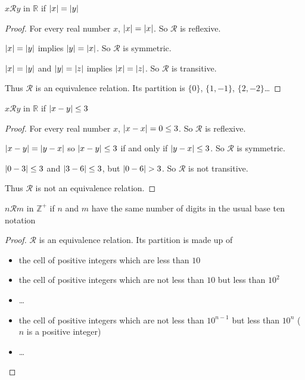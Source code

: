 \begin{exercise}
    $x\mathscr{R}y$ in $\mathbb{R}$ if $\left\vert{x}\right\vert = \left\vert{y}\right\vert$
\end{exercise}

\begin{proof}
    For every real number $x$, $\left\vert{x}\right\vert = \left\vert{x}\right\vert$. So $\mathscr{R}$ is reflexive.

    $\left\vert{x}\right\vert = \left\vert{y}\right\vert$ implies $\left\vert{y}\right\vert = \left\vert{x}\right\vert$. So $\mathscr{R}$ is symmetric.

    $\left\vert{x}\right\vert = \left\vert{y}\right\vert$ and $\left\vert{y}\right\vert = \left\vert{z}\right\vert$ implies $\left\vert{x}\right\vert = \left\vert{z}\right\vert$. So $\mathscr{R}$ is transitive.

    Thus $\mathscr{R}$ is an equivalence relation. Its partition is $\{ 0 \}$, $\{ 1, -1 \}$, $\{ 2, -2 \}$\ldots
\end{proof}

\begin{exercise}
    $x\mathscr{R}y$ in $\mathbb{R}$ if $\left\vert{x - y}\right\vert\le 3$
\end{exercise}

\begin{proof}
    For every real number $x$, $\left\vert{x - x}\right\vert = 0 \le 3$. So $\mathscr{R}$ is reflexive.

    $\left\vert{x - y}\right\vert = \left\vert{y - x}\right\vert$ so $\left\vert{x - y}\right\vert\le 3$ if and only if $\left\vert{y - x}\right\vert\le 3$. So $\mathscr{R}$ is symmetric.

    $\left\vert{0 - 3}\right\vert\le 3$ and $\left\vert{3 - 6}\right\vert\le 3$, but $\left\vert{0 - 6}\right\vert > 3$. So $\mathscr{R}$ is not transitive.

    Thus $\mathscr{R}$ is not an equivalence relation.
\end{proof}

\begin{exercise}
    $n\mathscr{R}m$ in $\mathbb{Z}^{+}$ if $n$ and $m$ have the same number of digits in the usual base ten notation
\end{exercise}

\begin{proof}
    $\mathscr{R}$ is an equivalence relation. Its partition is made up of
    \begin{itemize}
        \item the cell of positive integers which are less than $10$
        \item the cell of positive integers which are not less than $10$ but less than $10^{2}$
        \item \ldots
        \item the cell of positive integers which are not less than $10^{n-1}$ but less than $10^{n}$ ($n$ is a positive integer)
        \item \ldots
    \end{itemize}
\end{proof}


